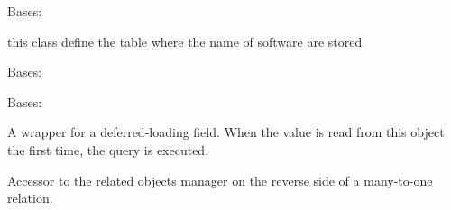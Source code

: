 \documentclass[letterpaper,10pt,english]{sphinxmanual}
\begin{document}
\begin{fulllineitems}
\label{\detokenize{QuChemPedIA.models:QuChemPedIA.models.SoftwareModel.Software}}
Bases: 

this class define the table where the name of software are stored

\begin{fulllineitems}
\label{\detokenize{QuChemPedIA.models:QuChemPedIA.models.SoftwareModel.Software.DoesNotExist}}
Bases: 

\end{fulllineitems}


\begin{fulllineitems}
\label{\detokenize{QuChemPedIA.models:QuChemPedIA.models.SoftwareModel.Software.MultipleObjectsReturned}}
Bases: 

\end{fulllineitems}


\begin{fulllineitems}
\label{\detokenize{QuChemPedIA.models:QuChemPedIA.models.SoftwareModel.Software.id_software}}
A wrapper for a deferred-loading field. When the value is read from this
object the first time, the query is executed.

\end{fulllineitems}


\begin{fulllineitems}
\label{\detokenize{QuChemPedIA.models:QuChemPedIA.models.SoftwareModel.Software.importfile_set}}
Accessor to the related objects manager on the reverse side of a
many-to-one relation.


\end{fulllineitems}
\end{fulllineitems}
\end{document}
